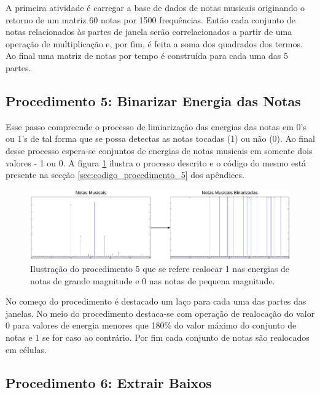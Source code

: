 A primeira atividade é carregar a base de dados de notas musicais originando o retorno de um matriz 60 notas por 1500 frequências. Então cada conjunto de notas relacionados às partes de janela serão correlacionados a partir de uma operação de multiplicação e, por fim, é feita a soma dos quadrados dos termos. Ao final uma matriz de notas por tempo é construída para cada uma das 5 partes.

\subsection{Procedimento 5: Binarizar Energia das Notas}
\label{subsec:procedimento_5}

Esse passo compreende o processo de limiarização das energias das notas em 0's ou 1's de tal forma que se possa detectas as notas tocadas (1) ou não (0). Ao final desse processo espera-se conjuntos de energias de notas musicais em somente dois valores - 1 ou 0. A figura \ref{fig:procedimento_5} ilustra o processo descrito e o código do mesmo está presente na secção \ref{sec:codigo_procedimento_5} dos apêndices.

\begin{figure}[h] 
  \centering
    \includegraphics[keepaspectratio=true, scale=0.55]{figuras/procedimento_5}
    \caption{Ilustração do procedimento 5 que se refere realocar 1 nas energias de notas de grande magnitude e 0 nas notas de pequena magnitude.}
    \label{fig:procedimento_5}
\end{figure}

No começo do procedimento é destacado um laço para cada uma das partes das janelas. No meio do procedimento destaca-se com operação de realocação do valor 0 para valores de energia menores que 180\% do valor máximo do conjunto de notas e 1 se for caso ao contrário. Por fim cada conjunto de notas são realocados em células.

\subsection{Procedimento 6: Extrair Baixos}
\label{subsec:procedimento_6}

